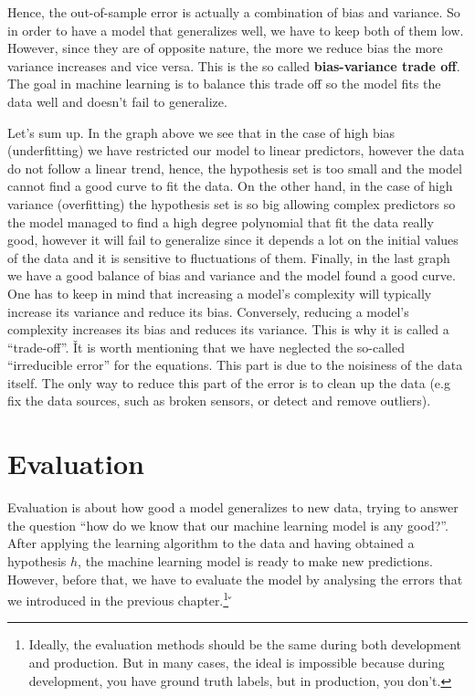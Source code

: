 Hence, the out-of-sample error is actually a combination of bias and variance. So in order to have a model that
generalizes well, we have to keep both of them low. However, since they are of opposite nature, the more we reduce
bias the more variance increases and vice versa. This is the so called \textbf{bias-variance trade off}. The goal in
machine learning is to balance this trade off so the model fits the data well and doesn't fail to generalize.


Let's sum up. In the graph above we see that in the case of high bias (underfitting) we have restricted our model to
linear predictors, however the data do not follow a linear trend, hence, the hypothesis set is too small and the model
cannot find a good curve to fit the data. On the other hand, in the case of high variance (overfitting) the
hypothesis set is so big allowing complex predictors so the model managed to find a high degree polynomial that fit
the data really good, however it will fail to generalize since it depends a lot on the initial values of the data and
it is sensitive to fluctuations of them. Finally, in the last graph we have a good balance of bias and variance and
the model found a good curve. One has to keep in mind that increasing a model's complexity will typically increase
its variance and reduce its bias. Conversely, reducing a model's complexity increases its bias and reduces its
variance. This is why it is called a ``trade-off''. \v

It is worth mentioning that we have neglected the so-called ``irreducible error'' for the equations. This part is
due to the noisiness of the data itself. The only way to reduce this part of the error is to clean up the data (e.g
fix the data sources, such as broken sensors, or detect and remove outliers).

\section{Evaluation}

Evaluation is about how good a model generalizes to new data, trying to answer the question ``how do we know that our
machine learning model is any good?''. After applying the learning algorithm to the data and having obtained a
hypothesis $h$, the machine learning model is ready to make new predictions. However, before that, we have to evaluate
the model by analysing the errors that we introduced in the previous chapter.\footnote{Ideally, the evaluation
methods should be the same during both development and production. But in many cases, the ideal is impossible because
during development, you have ground truth labels, but in production, you don't.} \v

